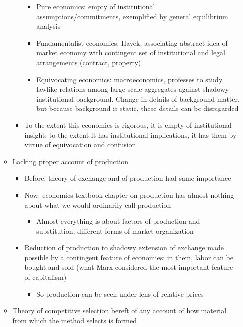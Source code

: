\begin{itemize}
\begin{itemize}
\begin{itemize}
      \begin{itemize}
      \tightlist
      \item
        Pure economics: empty of institutional assumptions/commitments,
        exemplified by general equilibrium analysis
      \item
        Fundamentalist economics: Hayek, associating abstract idea of
        market economy with contingent set of institutional and legal
        arrangements (contract, property)
      \item
        Equivocating economics: macroeconomics, professes to study
        lawlike relations among large-scale aggregates against shadowy
        institutional background. Change in details of background
        matter, but because background is static, these details can be
        disregarded
      \end{itemize}
    \item
      To the extent this economics is rigorous, it is empty of
      institutional insight; to the extent it has institutional
      implications, it has them by virtue of equivocation and confusion
    \end{itemize}
  \item
    Lacking proper account of production

    \begin{itemize}
    \tightlist
    \item
      Before: theory of exchange and of production had same importance
    \item
      Now: economics textbook chapter on production has almost nothing
      about what we would ordinarily call production

      \begin{itemize}
      \tightlist
      \item
        Almost everything is about factors of production and
        substitution, different forms of market organization
      \end{itemize}
    \item
      Reduction of production to shadowy extension of exchange made
      possible by a contingent feature of economies: in them, labor can
      be bought and sold (what Marx considered the most important
      feature of capitalism)

      \begin{itemize}
      \tightlist
      \item
        So production can be seen under lens of relative prices
      \end{itemize}
    \end{itemize}
  \item
    Theory of competitive selection bereft of any account of how
    material from which the method selects is formed


\end{itemize}
\end{itemize}
